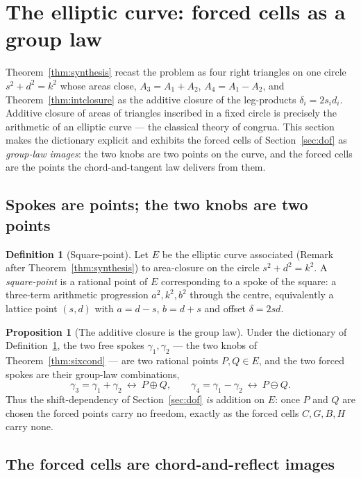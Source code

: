 \documentclass[11pt]{article}
\theoremstyle{definition}
\newtheorem{definition}{Definition}
\newtheorem{proposition}{Proposition}
\begin{document}
\section{The elliptic curve: forced cells as a group law}\label{sec:elliptic}

Theorem~\ref{thm:synthesis} recast the problem as four right triangles on one
circle $s^{2}+d^{2}=k^{2}$ whose areas close, $A_3=A_1+A_2$, $A_4=A_1-A_2$, and
Theorem~\ref{thm:intclosure} as the additive closure of the leg-products
$\delta_i=2s_id_i$. Additive closure of areas of triangles inscribed in a fixed
circle is precisely the arithmetic of an elliptic curve --- the classical theory
of congrua. This section makes the dictionary explicit and exhibits the forced
cells of Section~\ref{sec:dof} as \emph{group-law images}: the two knobs are two
points on the curve, and the forced cells are the points the chord-and-tangent
law delivers from them.

\subsection{Spokes are points; the two knobs are two points}

\begin{definition}[Square-point]\label{def:sqpt}
Let $E$ be the elliptic curve associated (Remark after Theorem~\ref{thm:synthesis})
to area-closure on the circle $s^{2}+d^{2}=k^{2}$. A \emph{square-point} is a
rational point of $E$ corresponding to a spoke of the square: a three-term
arithmetic progression $a^{2},k^{2},b^{2}$ through the centre, equivalently a
lattice point $(s,d)$ with $a=d-s$, $b=d+s$ and offset $\delta=2sd$.
\end{definition}

\begin{proposition}[The additive closure is the group law]\label{prop:grouplaw}
Under the dictionary of Definition~\ref{def:sqpt}, the two free spokes
$\gamma_1,\gamma_2$ --- the two knobs of Theorem~\ref{thm:sixcond} --- are two
rational points $P,Q\in E$, and the two forced spokes are their group-law
combinations,
\[
  \gamma_3=\gamma_1+\gamma_2\ \longleftrightarrow\ P\oplus Q,
  \qquad
  \gamma_4=\gamma_1-\gamma_2\ \longleftrightarrow\ P\ominus Q.
\]
Thus the shift-dependency of Section~\ref{sec:dof} \emph{is} addition on $E$: once
$P$ and $Q$ are chosen the forced points carry no freedom, exactly as the forced
cells $C,G,B,H$ carry none.
\end{proposition}

\subsection{The forced cells are chord-and-reflect images}
\end{document}
